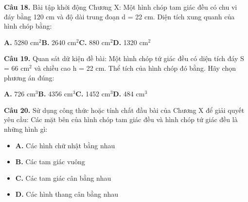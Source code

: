 \documentclass[11pt,a4paper]{article}
\begin{document}
\textbf{\color{primary} Câu 18.} Bài tập khởi động Chương X: Một hình chóp tam giác đều có chu vi đáy bằng 120 cm và độ dài trung đoạn d = 22 cm. Diện tích xung quanh của hình chóp bằng:\par
\hspace*{1.5em}\textbf{A.} 5280 cm$^2$\quad\quad \textbf{B.} 2640 cm$^2$\quad\quad \textbf{C.} 880 cm$^2$\quad\quad \textbf{D.} 1320 cm$^2$\par\vspace{2pt}
\textbf{\color{primary} Câu 19.} Quan sát dữ kiện đề bài: Một hình chóp tứ giác đều có diện tích đáy S = 66 cm$^2$ và chiều cao h = 22 cm. Thể tích của hình chóp đó bằng. Hãy chọn phương án đúng:\par
\hspace*{1.5em}\textbf{A.} 726 cm$^3$\quad\quad \textbf{B.} 4356 cm$^3$\quad\quad \textbf{C.} 1452 cm$^3$\quad\quad \textbf{D.} 484 cm$^3$\par\vspace{2pt}
\textbf{\color{primary} Câu 20.} Sử dụng công thức hoặc tính chất đầu bài của Chương X để giải quyết yêu cầu: Các mặt bên của hình chóp tam giác đều và hình chóp tứ giác đều là những hình gì:\par
\begin{itemize}\setlength{\itemsep}{1pt}\setlength{\parskip}{0pt}
  \item[] \textbf{A.} Các hình chữ nhật bằng nhau
  \item[] \textbf{B.} Các tam giác vuông
  \item[] \textbf{C.} Các tam giác cân bằng nhau
  \item[] \textbf{D.} Các hình thang cân bằng nhau
\end{itemize}\vspace{2pt}
\end{document}
